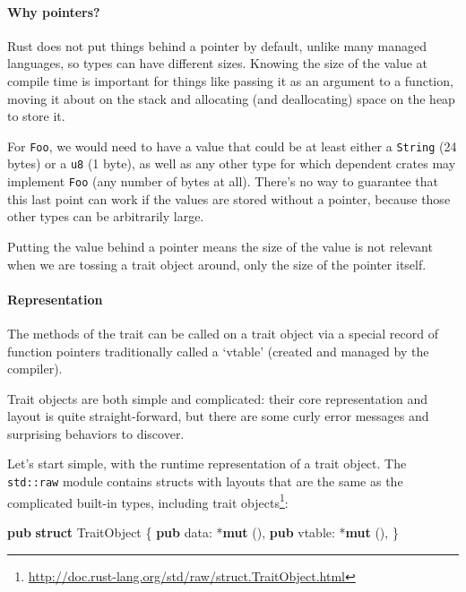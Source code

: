 \documentclass[a4paper,]{book}
\newenvironment{Shaded}{\begin{snugshade}}{\end{snugshade}}
\newcommand{\KeywordTok}[1]{\textcolor[rgb]{0.13,0.29,0.53}{\textbf{{#1}}}}
\newcommand{\NormalTok}[1]{{#1}}
\renewcommand{\href}[2]{#2\footnote{\url{#1}}}
\let\oldparagraph\paragraph
\renewcommand{\paragraph}[1]{\oldparagraph{#1}\mbox{}}
\begin{document}
\paragraph{Why pointers?}\label{why-pointers}

Rust does not put things behind a pointer by default, unlike many
managed languages, so types can have different sizes. Knowing the size
of the value at compile time is important for things like passing it as
an argument to a function, moving it about on the stack and allocating
(and deallocating) space on the heap to store it.

For \texttt{Foo}, we would need to have a value that could be at least
either a \texttt{String} (24 bytes) or a \texttt{u8} (1 byte), as well
as any other type for which dependent crates may implement \texttt{Foo}
(any number of bytes at all). There's no way to guarantee that this last
point can work if the values are stored without a pointer, because those
other types can be arbitrarily large.

Putting the value behind a pointer means the size of the value is not
relevant when we are tossing a trait object around, only the size of the
pointer itself.

\paragraph{Representation}\label{representation}

The methods of the trait can be called on a trait object via a special
record of function pointers traditionally called a `vtable' (created and
managed by the compiler).

Trait objects are both simple and complicated: their core representation
and layout is quite straight-forward, but there are some curly error
messages and surprising behaviors to discover.

Let's start simple, with the runtime representation of a trait object.
The \texttt{std::raw} module contains structs with layouts that are the
same as the complicated built-in types,
\href{http://doc.rust-lang.org/std/raw/struct.TraitObject.html}{including
trait objects}:

\begin{Shaded}
\begin{Highlighting}[]
\KeywordTok{pub} \KeywordTok{struct} \NormalTok{TraitObject \{}
    \KeywordTok{pub} \NormalTok{data: *}\KeywordTok{mut} \NormalTok{(),}
    \KeywordTok{pub} \NormalTok{vtable: *}\KeywordTok{mut} \NormalTok{(),}
\NormalTok{\}}
\end{Highlighting}
\end{Shaded}
\end{document}
